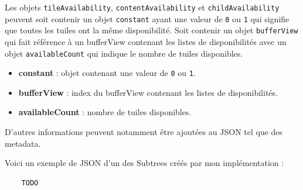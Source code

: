 Les objets \texttt{tileAvailability}, \texttt{contentAvailability} et \texttt{childAvailability} peuvent soit contenir un objet \texttt{constant} ayant une valeur de \texttt{0} ou \texttt{1} qui signifie que toutes les tuiles ont la même disponibilité. Soit contenir un objet \texttt{bufferView} qui fait référence à un bufferView contenant les listes de disponibilités avec un objet \texttt{availableCount} qui indique le nombre de tuiles disponibles.

\begin{itemize}
    \item \textbf{constant} : objet contenant une valeur de \texttt{0} ou \texttt{1}.
    \item \textbf{bufferView} : index du bufferView contenant les listes de disponibilités.
    \item \textbf{availableCount} : nombre de tuiles disponibles.
\end{itemize}

D'autres informations peuvent notamment être ajoutées au JSON tel que des metadata.

Voici un exemple de JSON d'un des Subtrees créés par mon implémentation :

\begin{verbatim}
    TODO
\end{verbatim}